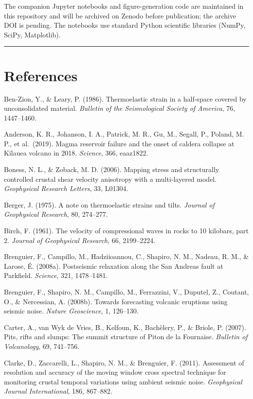 \documentclass[draft]{agujournal2019}
\begin{document}
The companion Jupyter notebooks and figure-generation code are
maintained in this repository and will be archived on Zenodo before
publication; the archive DOI is pending. The notebooks use standard
Python scientific libraries (NumPy, SciPy, Matplotlib).

\begin{center}\rule{0.5\linewidth}{0.5pt}\end{center}

\section{References}\label{references}

Ben-Zion, Y., \& Leary, P. (1986). Thermoelastic strain in a half-space
covered by unconsolidated material. \emph{Bulletin of the Seismological
Society of America}, 76, 1447--1460.

Anderson, K. R., Johanson, I. A., Patrick, M. R., Gu, M., Segall, P.,
Poland, M. P., et al.~(2019). Magma reservoir failure and the onset of
caldera collapse at Kīlauea volcano in 2018. \emph{Science}, 366,
eaaz1822.

Boness, N. L., \& Zoback, M. D. (2006). Mapping stress and structurally
controlled crustal shear velocity anisotropy with a multi-layered model.
\emph{Geophysical Research Letters}, 33, L01304.

Berger, J. (1975). A note on thermoelastic strains and tilts.
\emph{Journal of Geophysical Research}, 80, 274--277.

Birch, F. (1961). The velocity of compressional waves in rocks to 10
kilobars, part 2. \emph{Journal of Geophysical Research}, 66,
2199--2224.

Brenguier, F., Campillo, M., Hadziioannou, C., Shapiro, N. M., Nadeau,
R. M., \& Larose, É. (2008a). Postseismic relaxation along the San
Andreas fault at Parkfield. \emph{Science}, 321, 1478--1481.

Brenguier, F., Shapiro, N. M., Campillo, M., Ferrazzini, V., Duputel,
Z., Coutant, O., \& Nercessian, A. (2008b). Towards forecasting volcanic
eruptions using seismic noise. \emph{Nature Geoscience}, 1, 126--130.

Carter, A., van Wyk de Vries, B., Kelfoun, K., Bachèlery, P., \& Briole,
P. (2007). Pits, rifts and slumps: The summit structure of Piton de la
Fournaise. \emph{Bulletin of Volcanology}, 69, 741--756.

Clarke, D., Zaccarelli, L., Shapiro, N. M., \& Brenguier, F. (2011).
Assessment of resolution and accuracy of the moving window cross
spectral technique for monitoring crustal temporal variations using
ambient seismic noise. \emph{Geophysical Journal International}, 186,
867--882.
\end{document}
